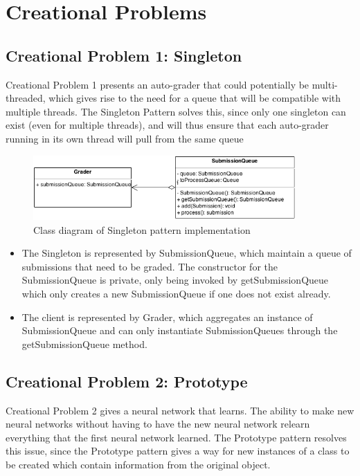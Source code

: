 \documentclass[12pt]{article}
\begin{document}
\newpage
\section{Creational Problems}
\subsection{Creational Problem 1: Singleton}

Creational Problem 1 presents an auto-grader that could potentially be 
multi-threaded, which gives rise to the need for a queue that will be compatible
with multiple threads. The Singleton Pattern solves this, since only one 
singleton can exist (even for multiple threads), and will thus ensure that each
auto-grader running in its own thread will pull from the same queue

\begin{figure}[!htb]
  \begin{center}
    \includegraphics[width=100mm]{Singleton.png}
    \caption{Class diagram of Singleton pattern implementation}
    \label{fig:singleton}
  \end{center} 
\end{figure}

\begin{itemize}
\item The Singleton is represented by {\ttfamily SubmissionQueue}, which 
  maintain a queue of submissions that need to be graded. The constructor for 
  the SubmissionQueue is private, only being invoked by 
  {\ttfamily getSubmissionQueue} which only creates a new 
  {\ttfamily SubmissionQueue} if one does not exist already.
\item The client is represented by {\ttfamily Grader}, which aggregates an
  instance of {\ttfamily SubmissionQueue} and can only instantiate
  SubmissionQueues through the {\ttfamily getSubmissionQueue} method.
\end{itemize}

\newpage
\subsection{Creational Problem 2: Prototype}

Creational Problem 2 gives a neural network that learns. The ability to make new
neural networks without having to have the new neural network relearn everything
that the first neural network learned. The Prototype pattern resolves this 
issue, since the Prototype pattern gives a way for new instances of a class to 
be created which contain information from the original object.
\end{document}
